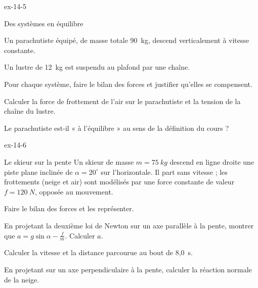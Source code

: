 \begin{blocLivre}{ex-14-5}
\begin{exercice}[1]{Des systèmes en équilibre}
\begin{questions}[label=\otLabel{\alph*.},leftmargin=1.9em,itemsep=0pt,parsep=0.15em]
\item Un parachutiste équipé, de masse totale 90~kg, descend verticalement à vitesse constante.
\item Un lustre de 12~kg est suspendu au plafond par une chaîne.
\end{questions}
\begin{questions}
\item Pour chaque système, faire le bilan des forces et justifier qu'elles se compensent.
\item Calculer la force de frottement de l'air sur le parachutiste et la tension de la chaîne du lustre.
\item Le parachutiste est-il « à l'équilibre » au sens de la définition du cours ?
\end{questions}
\end{exercice}
\end{blocLivre}
\begin{blocLivre}{ex-14-6}
\begin{exercice}[2]{Le skieur sur la pente}
Un skieur de masse $m=\qty{75}{kg}$ descend en ligne droite une piste plane inclinée de $\alpha=20^\circ$ sur
l'horizontale. Il part sans vitesse ; les frottements (neige et air) sont modélisés par une force constante de valeur
$f=\qty{120}{N}$, opposée au mouvement.
\begin{questions}
\item Faire le bilan des forces et les représenter.
\item En projetant la deuxième loi de Newton sur un axe parallèle à la pente, montrer que $a=g\sin\alpha-\frac{f}{m}$.
Calculer $a$.
\item Calculer la vitesse et la distance parcourue au bout de 8,0~s.
\item En projetant sur un axe perpendiculaire à la pente, calculer la réaction normale de la neige.
\end{questions}
\end{exercice}
\end{blocLivre}
